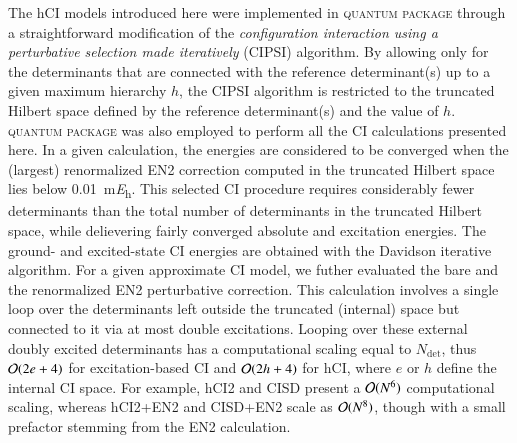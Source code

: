 \documentclass[aip,jcp,reprint,noshowkeys,superscriptaddress]{revtex4-1}
\newcommand{\QP}{\textsc{quantum package}}
\newcommand{\Ndet}{N_\text{det}}
\begin{document}
The hCI models introduced here were implemented in {\QP} \cite{Garniron_2019} through a straightforward modification of the
\textit{configuration interaction using a perturbative selection made iteratively} (CIPSI) algorithm. \cite{Huron_1973,Giner_2013,Giner_2015,Garniron_2018}
By allowing only for the determinants that are connected with the reference determinant(s) up to a given maximum hierarchy $h$,
the CIPSI algorithm is restricted to the truncated Hilbert space defined by the reference determinant(s) and the value of $h$.
{\QP} \cite{Garniron_2019} was also employed to perform all the CI calculations presented here.
In a given calculation, the energies are considered to be converged when the (largest) renormalized EN2 correction computed in the truncated Hilbert space 
lies below \SI{0.01}{\milli\hartree}. \cite{Garniron_2018}
This selected CI procedure requires considerably fewer determinants than the total number of determinants in the truncated Hilbert space,
while delievering fairly converged absolute and excitation energies.
The ground- and excited-state CI energies are obtained with the Davidson iterative algorithm. \cite{Davidson_1975}
For a given approximate CI model, we futher evaluated the bare and the renormalized EN2 perturbative correction. \cite{Garniron_2019} 
This calculation involves a single loop over the determinants left outside the truncated (internal) space but connected to it via at most double excitations.
Looping over these external doubly excited determinants has a computational scaling equal to $\Ndet$,
thus $\order*{2e+4}$ for excitation-based CI and $\order*{2h+4}$ for hCI, where $e$ or $h$ define the internal CI space.
For example, hCI2 and CISD present a $\order*{N^6}$ computational scaling, whereas hCI2+EN2 and CISD+EN2 scale as $\order*{N^8}$,
though with a small prefactor stemming from the EN2 calculation.
\end{document}
